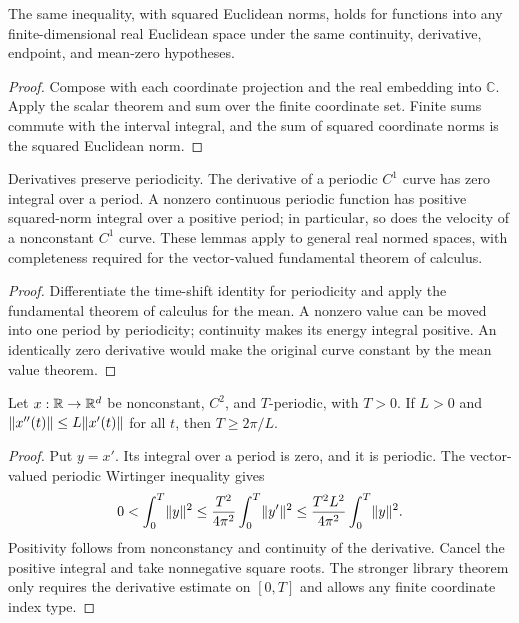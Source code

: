 \begin{proposition}
\label{prop:wirtinger-euclidean}
\leanok
{}
The same inequality, with squared Euclidean norms, holds for functions
into any finite-dimensional real Euclidean space under the same
continuity, derivative, endpoint, and mean-zero hypotheses.
\end{proposition}
\begin{proof}
\leanok
Compose with each coordinate projection and the real embedding into
$\mathbb C$. Apply the scalar theorem and sum over the finite coordinate
set. Finite sums commute with the interval integral, and the sum of
squared coordinate norms is the squared Euclidean norm.
\end{proof}

\begin{lemma}
\label{lem:periodic-energy}
\leanok
Derivatives preserve periodicity. The derivative of a periodic $C^1$
curve has zero integral over a period. A nonzero continuous periodic
function has positive squared-norm integral over a positive period;
in particular, so does the velocity of a nonconstant $C^1$ curve.
These lemmas apply to general real normed spaces, with completeness
required for the vector-valued fundamental theorem of calculus.
\end{lemma}
\begin{proof}
\leanok
Differentiate the time-shift identity for periodicity and apply the
fundamental theorem of calculus for the mean. A nonzero value can be
moved into one period by periodicity; continuity makes its energy
integral positive. An identically zero derivative would make the
original curve constant by the mean value theorem.
\end{proof}

\begin{proposition}
\label{prop:period-bound}
\leanok
{}
Let $x:\mathbb{R}\to\mathbb{R}^d$ be nonconstant, $C^2$, and $T$-periodic, with $T>0$.
If $L>0$ and $\lVert x''(t)\rVert\leq L\lVert x'(t)\rVert$ for all $t$, then
$T\geq 2\pi/L$.
\end{proposition}
\begin{proof}
\leanok
Put $y=x'$. Its integral over a period is zero, and it is periodic.
The vector-valued periodic Wirtinger inequality gives
\[
 0<\int_0^T\lVert y\rVert^2\leq
 \frac{T^2}{4\pi^2}\int_0^T\lVert y'\rVert^2\leq
 \frac{T^2L^2}{4\pi^2}\int_0^T\lVert y\rVert^2.
\]
Positivity follows from nonconstancy and continuity of the derivative.
Cancel the positive integral and take nonnegative square roots.
The stronger library theorem only requires the derivative estimate on
$[0,T]$ and allows any finite coordinate index type.
\end{proof}

